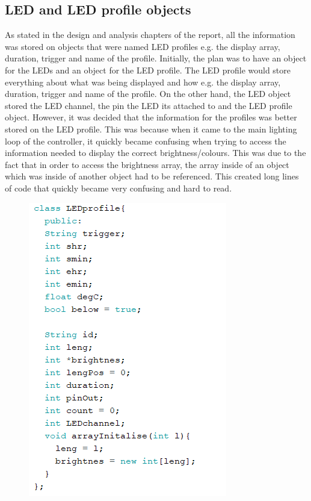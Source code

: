 \subsection {LED and LED profile objects}
As stated in the design and analysis chapters of the report, all the information was stored on objects that were named LED profiles e.g. the display array, duration, trigger and name of the profile. Initially, the plan was to have an object for the LEDs and an object for the LED profile. The LED profile would store everything about what was being displayed and how e.g. the display array, duration, trigger and name of the profile. On the other hand, the LED object stored the LED channel, the pin the LED its attached to and the LED profile object. However, it was decided that the information for the profiles was better stored on the LED profile. This was because when it came to the main lighting loop of the controller, it quickly became confusing when trying to access the information needed to display the correct brightness/colours. This was due to the fact that in order to access the brightness array, the array inside of an object which was inside of another object had to be referenced. This created long lines of code that quickly became very confusing and hard to read.

\begin{figure}[h]
\centering
\includegraphics{BLEDProfile}
\end{figure}


